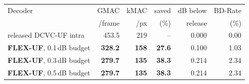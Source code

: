 \begin{tabular}{lrrrrr}
\toprule
Decoder & GMAC & kMAC & saved & dB below & BD-Rate \\
 & /frame & /px & (\%) & release & (\%) \\
\midrule
released DCVC-UF intra & 453.5 & 219 & -- & 0.000 & 0.00 \\
\midrule
\textbf{FLEX-UF}, 0.1\,dB budget & \textbf{328.2} & \textbf{158} & \textbf{27.6} & 0.100 & 1.03 \\
\textbf{FLEX-UF}, 0.3\,dB budget & \textbf{279.7} & \textbf{135} & \textbf{38.3} & 0.214 & 2.34 \\
\textbf{FLEX-UF}, 0.5\,dB budget & \textbf{279.7} & \textbf{135} & \textbf{38.3} & 0.214 & 2.34 \\
\bottomrule
\end{tabular}
